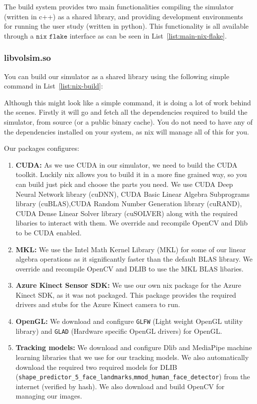 The build system provides two main functionalities compiling the simulator (written in c++) as a shared library, and providing development environments for running the user study (written in python). This functionality is all available through a $\texttt{nix flake}$ interface as can be seen in List~\ref{list:main-nix-flake}. 


\subsubsection{libvolsim.so}

You can build our simulator as a shared library using the following simple command in List~\ref{list:nix-build}:

Although this might look like a simple command, it is doing a lot of work behind the scenes. Firstly it will go and fetch all the dependencies required to build the simulator, from source (or a public binary cache). You do not need to have any of the dependencies installed on your system, as nix will manage all of this for you. 

Our packages configures:
\begin{enumerate}
	\item \textbf{CUDA:} As we use CUDA in our simulator, we need to build the CUDA toolkit. Luckily nix allows you to build it in a more fine grained way, so you can build just pick and choose the parts you need. We use CUDA Deep Neural Network library (cuDNN), CUDA Basic Linear Algebra Subprograms library (cuBLAS),CUDA Random Number Generation library (cuRAND), CUDA Dense Linear Solver library (cuSOLVER) along with the required libaries to interact with them. We override and recompile OpenCV and Dlib to be CUDA enabled. \tocite
	\item \textbf{MKL:} We use the Intel Math Kernel Library (MKL) for some of our linear algebra operations as it significantly faster than the default BLAS library. We override and recompile OpenCV and DLIB to use the MKL BLAS libaries. \tocite
	\item \textbf{Azure Kinect Sensor SDK:} We use our own nix package for the Azure Kinect SDK, as it was not packaged. This package provides the required drivers and stubs for the Azure Kinect camera to run. \tocite
	\item \textbf{OpenGL:} We download and configure \texttt{GLFW} (Light weight OpenGL utility library) and \texttt{GLAD} (Hardware specific OpenGL drivers) for OpenGL. \tocite
	\item \textbf{Tracking models:} We download and configure Dlib and MediaPipe machine learning libraries that we use for our tracking models. We also automatically download the required two required models for DLIB (\texttt{shape\_predictor\_5\_face\_landmarks},\texttt{mmod\_human\_face\_detector}) from the internet (verified by hash). We also download and build OpenCV for managing our images. \tocite
\end{enumerate}

